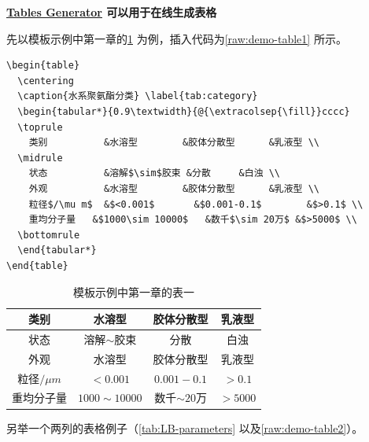 \textbf{\href{https://www.tablesgenerator.com/}{Tables Generator} 可以用于在线生成表格}

先以模板示例中第一章的\cref{tab:category} 为例，插入代码为\cref{raw:demo-table1} 所示。

\begin{lstlisting}[language={[LaTeX]TeX}, caption={示例插表代码}, label=raw:demo-table1]
\begin{table}
  \centering
  \caption{水系聚氨酯分类} \label{tab:category}
  \begin{tabular*}{0.9\textwidth}{@{\extracolsep{\fill}}cccc}
  \toprule
    类别			&水溶型		&胶体分散型		&乳液型 \\
  \midrule
    状态			&溶解$\sim$胶束	&分散		&白浊 \\
    外观			&水溶型		&胶体分散型		&乳液型 \\
    粒径$/\mu m$	&$<0.001$		&$0.001-0.1$		&$>0.1$ \\
    重均分子量	&$1000\sim 10000$	&数千$\sim 20万$ &$>5000$ \\
  \bottomrule
  \end{tabular*}
\end{table}
\end{lstlisting}

\begin{table}
  \centering
  \caption{模板示例中第一章的表一} \label{tab:category}
  \begin{tabular*}{0.9\textwidth}{@{\extracolsep{\fill}}cccc}
  \toprule
    类别			&水溶型		&胶体分散型		&乳液型 \\
  \midrule
    状态			&溶解$\sim$胶束	&分散		&白浊 \\
    外观			&水溶型		&胶体分散型		&乳液型 \\
    粒径$/\mu m$	&$<0.001$		&$0.001-0.1$		&$>0.1$ \\
    重均分子量	&$1000\sim 10000$	&数千$\sim 20$万 &$>5000$ \\
  \bottomrule
  \end{tabular*}
\end{table}

另举一个两列的表格例子（\cref{tab:LB-parameters} 以及\cref{raw:demo-table2}）。

